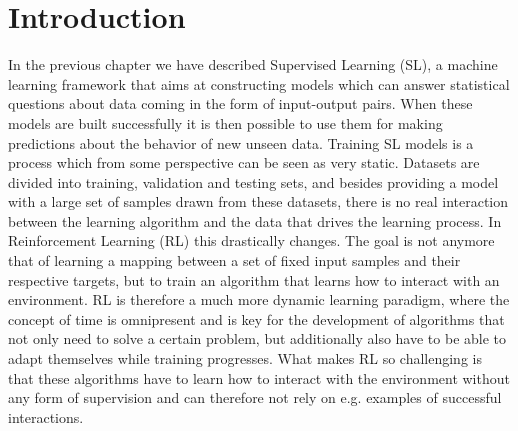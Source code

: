 \section{Introduction}
\label{sec:rl_introduction}
In the previous chapter we have described Supervised Learning (SL), a machine learning framework that aims at constructing models which can answer statistical questions about data coming in the form of input-output pairs. When these models are built successfully it is then possible to use them for making predictions about the behavior of new unseen data. Training SL models is a process which from some perspective can be seen as very static. Datasets are divided into training, validation and testing sets, and besides providing a model with a large set of samples drawn from these datasets, there is no real interaction between the learning algorithm and the data that drives the learning process. In Reinforcement Learning (RL) this drastically changes. The goal is not anymore that of learning a mapping between a set of fixed input samples and their respective targets, but to train an algorithm that learns how to interact with an environment. RL is therefore a much more dynamic learning paradigm, where the concept of time is omnipresent and is key for the development of algorithms that not only need to solve a certain problem, but additionally also have to be able to adapt themselves while training progresses. What makes RL so challenging is that these algorithms have to learn how to interact with the environment without any form of supervision and can therefore not rely on e.g. examples of successful interactions. 

